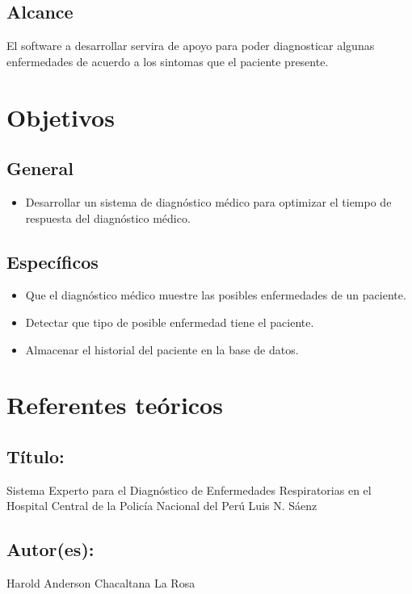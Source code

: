 \documentclass[preprint,12pt,notitlepage]{elsarticle}
\begin{document}
	\subsection{\textbf{ Alcance }}
El software a desarrollar servira de apoyo para poder diagnosticar algunas enfermedades de acuerdo a los sintomas que el paciente presente.

\section{Objetivos}
	\subsection{\textbf{ General }}
		\begin{itemize}
			\item Desarrollar un sistema de diagnóstico médico para optimizar el tiempo de respuesta del diagnóstico médico.
		\end{itemize}
	\subsection{\textbf{Específicos }}

\begin{itemize}
	\item Que el diagnóstico médico muestre las posibles enfermedades de un paciente.
	\item Detectar que tipo de posible enfermedad tiene el paciente. 
	\item Almacenar el historial del paciente en la base de datos. 
\end{itemize}

\section{Referentes teóricos}

\subsection{Título:} Sistema Experto para el Diagnóstico de Enfermedades Respiratorias en el Hospital Central de la Policía Nacional del Perú Luis N. Sáenz

\subsection{Autor(es):} Harold Anderson Chacaltana La Rosa
\end{document}
